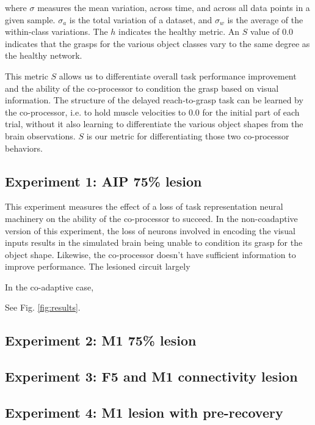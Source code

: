 \documentclass[12pt]{iopart}
\begin{document}
where $\sigma$ measures the mean variation, across time, and across all data points in
a given sample. $\sigma_{a}$ is the total variation of a dataset, and $\sigma_{w}$
is the average of the within-class variations. The $h$ indicates the healthy
metric. An $S$ value of 0.0 indicates that the grasps for the various object classes
vary to the same degree as the healthy network.

This metric $S$ allows us to differentiate overall task performance improvement
and the ability of the co-processor to condition the grasp based on visual information.
The structure of the delayed reach-to-grasp task can be learned by the co-processor,
i.e. to hold muscle velocities to 0.0 for the initial part of each trial, without it
also learning to differentiate the various object shapes from the brain observations.
$S$ is our metric for differentiating those two co-processor behaviors.

\subsection{Experiment 1: AIP 75\% lesion}
This experiment measures the effect of a loss of task representation neural
machinery on the ability of the co-processor to succeed. In the non-coadaptive
version of this experiment, the loss of neurons involved in encoding the
visual inputs results in the simulated brain being unable to condition its
grasp for the object shape. Likewise, the co-processor doesn't have sufficient
information to improve performance. The lesioned circuit largely 

In the co-adaptive case, 

See Fig. \ref{fig:results}.

\subsection{Experiment 2: M1 75\% lesion}
\subsection{Experiment 3: F5 and M1 connectivity lesion}
\subsection{Experiment 4: M1 lesion with pre-recovery}
\end{document}
